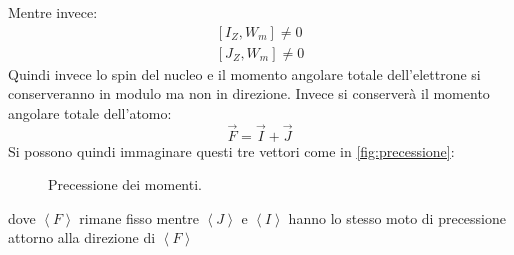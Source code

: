 Mentre invece:
\begin{equation}\begin{split}
\left [ I_Z, W_m \right ] \ne 0\\
\left [ J_Z, W_m \right ] \ne 0
\end{split}\end{equation}
Quindi invece lo spin del nucleo e il momento angolare totale dell'elettrone si 
conserveranno in modulo ma non in direzione. Invece si conserverà il momento 
angolare totale dell'atomo:
\begin{equation}
\vec{F} = \vec{I} + \vec{J}
\end{equation}
Si possono quindi immaginare questi tre vettori come in
\autoref{fig:precessione}:
\begin{figure}[hbtp]
\centering
\caption{Precessione dei momenti.}
\label{fig:precessione}

\end{figure}
dove $\left \langle F \right \rangle$ rimane fisso mentre $\left \langle J
\right \rangle$ e $\left \langle I \right \rangle$ hanno lo stesso moto di
precessione attorno alla direzione di $\left \langle F \right \rangle$

